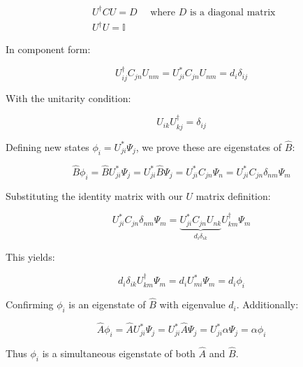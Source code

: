 \documentclass[italian]{HKNdocument}
\begin{document}
\begin{align}
& U^{\dagger} C U=D \quad \text { where } D \text { is a diagonal matrix } \\
& U^{\dagger} U=\mathbb{I} \label{eq:7.29}
\end{align}

In component form:

\begin{equation}
U_{i j}^{\dagger} C_{j n} U_{n m}=U_{j i}^{*} C_{j n} U_{n m}=d_{i} \delta_{i j} \label{eq:7.30}
\end{equation}

With the unitarity condition:

\begin{equation}
U_{i k} U_{k j}^{\dagger}=\delta_{i j} \label{eq:7.31}
\end{equation}

Defining new states $\phi_{i}=U_{j i}^{*} \Psi_{j}$, we prove these are eigenstates of $\hat{B}$:

\begin{equation}
\hat{B} \phi_{i}=\hat{B} U_{j i}^{*} \Psi_{j}=U_{j i}^{*} \hat{B} \Psi_{j}=U_{j i}^{*} C_{j n} \Psi_{n}=U_{j i}^{*} C_{j n} \delta_{n m} \Psi_{m} \label{eq:7.32}
\end{equation}

Substituting the identity matrix with our $U$ matrix definition:

\begin{equation}
U_{j i}^{*} C_{j n} \delta_{n m} \Psi_{m}=\underbrace{U_{j i}^{*} C_{j n} U_{n k}}_{d_{i} \delta_{i k}} U_{k m}^{\dagger} \Psi_{m} \label{eq:7.33}
\end{equation}

This yields:

\begin{equation}
d_{i} \delta_{i k} U_{k m}^{\dagger} \Psi_{m}=d_{i} U_{m i}^{*} \Psi_{m}=d_{i} \phi_{i} \label{eq:7.34}
\end{equation}

Confirming $\phi_{i}$ is an eigenstate of $\hat{B}$ with eigenvalue $d_i$. Additionally:

\begin{equation}
\hat{A} \phi_{i}=\hat{A} U_{j i}^{*} \Psi_{j}=U_{j i}^{*} \hat{A} \Psi_{j}=U_{j i}^{*} \alpha \Psi_{j}=\alpha \phi_{i} \label{eq:7.35}
\end{equation}

Thus $\phi_{i}$ is a simultaneous eigenstate of both $\hat{A}$ and $\hat{B}$.
\end{document}
